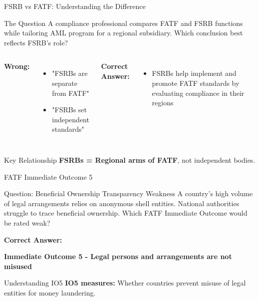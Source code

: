 \documentclass{beamer}
\begin{document}
\begin{frame}{FSRB vs FATF: Understanding the Difference}
\begin{block}{The Question}
\small{A compliance professional compares FATF and FSRB functions while tailoring AML program for a regional subsidiary. Which conclusion best reflects FSRB's role?}
\end{block}

\vspace{0.3cm}
\begin{columns}
\textcolor{wrong}{\textbf{ Wrong:}}
\begin{itemize}
    \item "FSRBs are separate from FATF"
    \item "FSRBs set independent standards"
\end{itemize}

\textcolor{correct}{\textbf{Correct Answer:}}
\begin{itemize}
    \item FSRBs help implement and promote FATF standards by evaluating compliance in their regions
\end{itemize}
\end{columns}

\begin{block}{Key Relationship}
\textbf{FSRBs = Regional arms of FATF}, not independent bodies.
\end{block}
\end{frame}

\begin{frame}{FATF Immediate Outcome 5}
\begin{block}{Question: Beneficial Ownership Transparency Weakness}
\small{A country's high volume of legal arrangements relies on anonymous shell entities. National authorities struggle to trace beneficial ownership. Which FATF Immediate Outcome would be rated weak?}
\end{block}

\vspace{0.3cm}
\textcolor{correct}{\textbf{Correct Answer:}}
\begin{center}
\Large{\textbf{Immediate Outcome 5 - Legal persons and arrangements are not misused}}
\end{center}

\begin{block}{Understanding IO5}
\textbf{IO5 measures:} Whether countries prevent misuse of legal entities for money laundering.
\end{block}
\end{frame}
\end{document}
